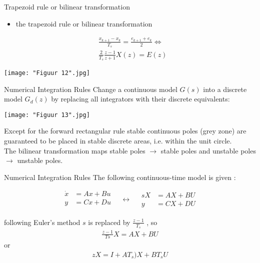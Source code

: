 \begin{frame}{Trapezoid rule or bilinear transformation}
\begin{itemize}
\item the trapezoid rule or bilinear transformation
\end{itemize}


\begin{align*}
&\frac{x_{k+1}-x_k}{T_s}=\frac{e_{k+1}+e_k}{2}\Leftrightarrow\\
&\frac{2}{T_s}\frac{z-1}{z+1}X(z)=E(z) 
\end{align*}

\begin{center}
    \texttt{[image: "Figuur 12".jpg]}\\
\end{center}
\end{frame}

\begin{frame}{Numerical Integration Rules}
Change a continuous model $G(s)$ into a discrete model
$G_d(z)$ by replacing all integrators with their discrete equivalents:
\begin{center}
    \texttt{[image: "Figuur 13".jpg]}\\
\end{center}

Except for the forward rectangular rule stable continuous
poles (grey zone) are guaranteed to be placed in stable
discrete areas, i.e. within the unit circle.\\
The bilinear transformation maps stable poles $\rightarrow$ stable
poles and unstable poles $\rightarrow$ unstable poles.
\end{frame}

\begin{frame}{Numerical Integration Rules}
The following continuous-time model is given :

\begin{equation*}
\begin{split}
    \dot{x} &= Ax+Bu\\
    y &= Cx+Du\\
  \end{split}
\quad\leftrightarrow\quad
  \begin{split}
    sX &= AX+BU\\
   y &= CX+DU
  \end{split}
\end{equation*}

following Euler’s method $s$ is replaced by $\frac{z-1}{T_s}$
, so
\begin{align*}
\frac{z-1}{Ts}X=AX+BU
\end{align*}
or
\begin{align*}
zX=I+AT_s)X+BT_sU
\end{align*}
\end{frame}

